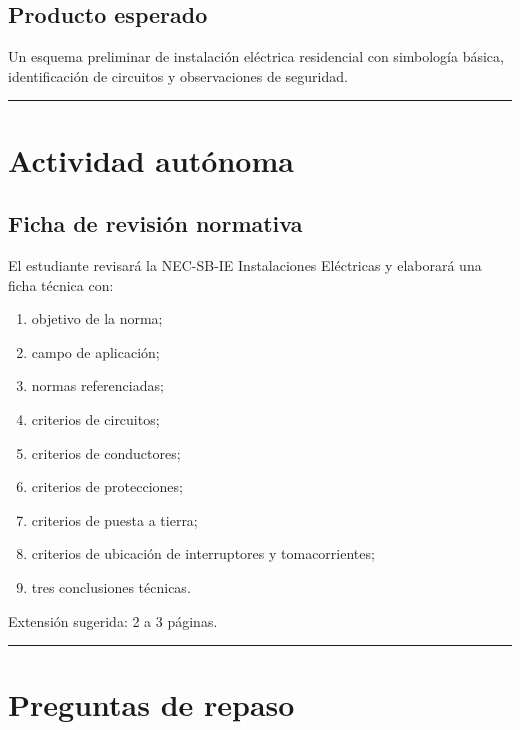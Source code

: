 \documentclass[
  spanish,
  letterpaper,
  DIV=11,
  numbers=noendperiod]{scrreprt}
\providecommand{\tightlist}{%
  \setlength{\itemsep}{0pt}\setlength{\parskip}{0pt}}
\begin{document}
\subsection{Producto esperado}\label{producto-esperado}

Un esquema preliminar de instalación eléctrica residencial con
simbología básica, identificación de circuitos y observaciones de
seguridad.

\begin{center}\rule{0.5\linewidth}{0.5pt}\end{center}

\section{Actividad autónoma}\label{actividad-autuxf3noma}

\subsection{Ficha de revisión
normativa}\label{ficha-de-revisiuxf3n-normativa}

El estudiante revisará la NEC-SB-IE Instalaciones Eléctricas y elaborará
una ficha técnica con:

\begin{enumerate}
\def\labelenumi{\arabic{enumi}.}
\tightlist
\item
  objetivo de la norma;
\item
  campo de aplicación;
\item
  normas referenciadas;
\item
  criterios de circuitos;
\item
  criterios de conductores;
\item
  criterios de protecciones;
\item
  criterios de puesta a tierra;
\item
  criterios de ubicación de interruptores y tomacorrientes;
\item
  tres conclusiones técnicas.
\end{enumerate}

Extensión sugerida: 2 a 3 páginas.

\begin{center}\rule{0.5\linewidth}{0.5pt}\end{center}

\section{Preguntas de repaso}\label{preguntas-de-repaso}
\end{document}
